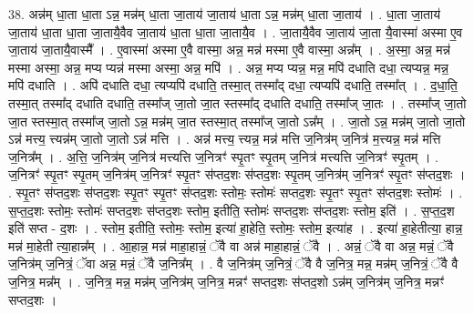 \documentclass[17pt]{extarticle}
\begin{document}
38. अन्न॑म् धा॒ता धा॒ता ऽन्न॒ मन्न॑म् धा॒ता जा॒ताय॑ जा॒ताय॑ धा॒ता ऽन्न॒ मन्न॑म् धा॒ता जा॒ताय॑ । . धा॒ता जा॒ताय॑ जा॒ताय॑ धा॒ता धा॒ता जा॒तायै॒वैव जा॒ताय॑ धा॒ता धा॒ता जा॒तायै॒व । . जा॒तायै॒वैव जा॒ताय॑ जा॒ता यै॒वास्मा॑ अस्मा ए॒व जा॒ताय॑ जा॒तायै॒वास्मै᳚ । . ए॒वास्मा॑ अस्मा ए॒वै वास्मा॒ अन्न॒ मन्न॑ मस्मा ए॒वै वास्मा॒ अन्न᳚म् । . अ॒स्मा॒ अन्न॒ मन्न॑ मस्मा अस्मा॒ अन्न॒ मप्य प्यन्न॑ मस्मा अस्मा॒ अन्न॒ मपि॑ । . अन्न॒ मप्य प्यन्न॒ मन्न॒ मपि॑ दधाति दधा॒ त्यप्यन्न॒ मन्न॒ मपि॑ दधाति । . अपि॑ दधाति दधा॒ त्यप्यपि॑ दधाति॒ तस्मा॒त् तस्मा᳚द् दधा॒ त्यप्यपि॑ दधाति॒ तस्मा᳚त् । . द॒धा॒ति॒ तस्मा॒त् तस्मा᳚द् दधाति दधाति॒ तस्मा᳚ज् जा॒तो जा॒त स्तस्मा᳚द् दधाति दधाति॒ तस्मा᳚ज् जा॒तः । . तस्मा᳚ज् जा॒तो जा॒त स्तस्मा॒त् तस्मा᳚ज् जा॒तो ऽन्न॒ मन्न॑म् जा॒त स्तस्मा॒त् तस्मा᳚ज् जा॒तो ऽन्न᳚म् । . जा॒तो ऽन्न॒ मन्न॑म् जा॒तो जा॒तो ऽन्न॑ मत्त्य॒ त्त्यन्न॑म् जा॒तो जा॒तो ऽन्न॑ मत्ति । . अन्न॑ मत्त्य॒ त्त्यन्न॒ मन्न॑ मत्ति ज॒नित्र॑म् ज॒नित्र॑ म॒त्त्यन्न॒ मन्न॑ मत्ति ज॒नित्र᳚म् । . अ॒त्ति॒ ज॒नित्र॑म् ज॒नित्र॑ मत्त्यत्ति ज॒नित्रꣳ॑ स्पृ॒तꣳ स्पृ॒तम् ज॒नित्र॑ मत्त्यत्ति ज॒नित्रꣳ॑ स्पृ॒तम् । . ज॒नित्रꣳ॑ स्पृ॒तꣳ स्पृ॒तम् ज॒नित्र॑म् ज॒नित्रꣳ॑ स्पृ॒तꣳ स॑प्तद॒शः स॑प्तद॒शः स्पृ॒तम् ज॒नित्र॑म् ज॒नित्रꣳ॑ स्पृ॒तꣳ स॑प्तद॒शः । . स्पृ॒तꣳ स॑प्तद॒शः स॑प्तद॒शः स्पृ॒तꣳ स्पृ॒तꣳ स॑प्तद॒शः स्तोमः॒ स्तोमः॑ सप्तद॒शः स्पृ॒तꣳ स्पृ॒तꣳ स॑प्तद॒शः स्तोमः॑ । . स॒प्त॒द॒शः स्तोमः॒ स्तोमः॑ सप्तद॒शः स॑प्तद॒शः स्तोम॒ इतीति॒ स्तोमः॑ सप्तद॒शः स॑प्तद॒शः स्तोम॒ इति॑ । . स॒प्त॒द॒श इति॑ सप्त - द॒शः । . स्तोम॒ इतीति॒ स्तोमः॒ स्तोम॒ इत्या॑ हा॒हेति॒ स्तोमः॒ स्तोम॒ इत्या॑ह । . इत्या॑ हा॒हेतीत्या॒ हान्न॒ मन्न॑ मा॒हेती त्या॒हान्न᳚म् । . आ॒हान्न॒ मन्न॑ माहा॒हान्नं॒ ॅवै वा अन्न॑ माहा॒हान्नं॒ ॅवै । . अन्नं॒ ॅवै वा अन्न॒ मन्नं॒ ॅवै ज॒नित्र॑म् ज॒नित्रं॒ ॅवा अन्न॒ मन्नं॒ ॅवै ज॒नित्र᳚म् । . वै ज॒नित्र॑म् ज॒नित्रं॒ ॅवै वै ज॒नित्र॒ मन्न॒ मन्न॑म् ज॒नित्रं॒ ॅवै वै ज॒नित्र॒ मन्न᳚म् । . ज॒नित्र॒ मन्न॒ मन्न॑म् ज॒नित्र॑म् ज॒नित्र॒ मन्नꣳ॑ सप्तद॒शः स॑प्तद॒शो ऽन्न॑म् ज॒नित्र॑म् ज॒नित्र॒ मन्नꣳ॑ सप्तद॒शः । \newline
\pagebreak
{}
\end{document}
